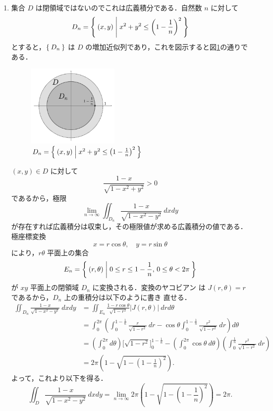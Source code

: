 \documentclass[11pt, uplatex, dvipdfmx]{jsarticle}
\begin{document}
\begin{enumerate}[(1)]
   \item 集合 $D$ は閉領域ではないのでこれは広義積分である．自然数 $n$ に対して
     \[
       D_n =\Set{(x,y) | x^2+y^2 \leq \left( 1- \frac{1}{n}\right)^2}
     \]
     とすると，$\Set{D_n}$ は $D$ の増加近似列であり，これを図示すると図\ref{fig:no21}の通りである．
     \begin{figure}[h]
       \centering
       \includegraphics[height=4cm]{./pictures/no21.pdf}
       \caption{ $D_n=\Set{(x,y)  |  x^2+y^2 \leq  \left(1-\frac{1}{n}\right)^2 }$}\label{fig:no21}
     \end{figure}

     $(x,y) \in D$ に対して
     \[
       \frac{1-x}{\sqrt{1-x^2+y^2}} >0
     \]
     であるから，極限
     \[
       \lim_{n\to \infty} \iint_{D_n} \frac{1-x}{\sqrt{1-x^2-y^2}}\  dx dy
     \]
     が存在すれば広義積分は収束し，その極限値が求める広義積分の値である．極座標変換
     \[
       x=r\cos\theta, \quad y=r\sin \theta
     \]
     により，$r\theta$ 平面上の集合
     \[
       E_n =\Set{(r, \theta) | 0 \leq r \leq 1-\frac{1}{n}, \, 0 \leq \theta < 2\pi}
     \]
     が $xy$ 平面上の閉領域 $D_n$ に変換される．変換のヤコビアン
     は $J(r,\theta)=r$ であるから，$D_n$ 上の重積分は以下のように書き
     直せる．
     \begin{align*}
       \iint_{D_n} \frac{1-x}{\sqrt{1-x^2-y^2}}\ dx dy
       &= \iint_{E_n} \frac{1-r\cos\theta}{\sqrt{1-r^2}} |J(r,\theta)| \ dr d\theta\\
       &= \int_{0}^{2\pi}\left( \int_{0}^{1-\frac{1}{n}} \frac{r}{\sqrt{1-r^2}} \ dr 
         - \cos \theta \int_{0}^{1-\frac{1}{n}}\frac{r^2}{\sqrt{1-r^2}}\ dr\right) d\theta\\
       &= \left(\int_{0}^{2\pi} d\theta\right)\Big[\sqrt{1-r^2}\Big]_{0}^{1-\frac{1}{n}}
         -\left( \int_{0}^{2\pi}\cos\theta \ d\theta\right) \left( \int_{0}^{\frac{1}{n}}\frac{r^2}{\sqrt{1-r^2}} \ dr\right)\\
       &=2\pi\left(1-\sqrt{1-\left(1-\frac{1}{n}\right)^2}\right).
     \end{align*}
     よって，これより以下を得る．
     \[
       \iint_{D}\frac{1-x}{\sqrt{1-x^2-y^2}}\ dx dy
       = \lim_{n \to \infty} 2\pi \left(1-\sqrt{1-\left(1-\frac{1}{n}\right)^2}\right) = 2\pi.
     \]


\end{enumerate}
\end{document}
